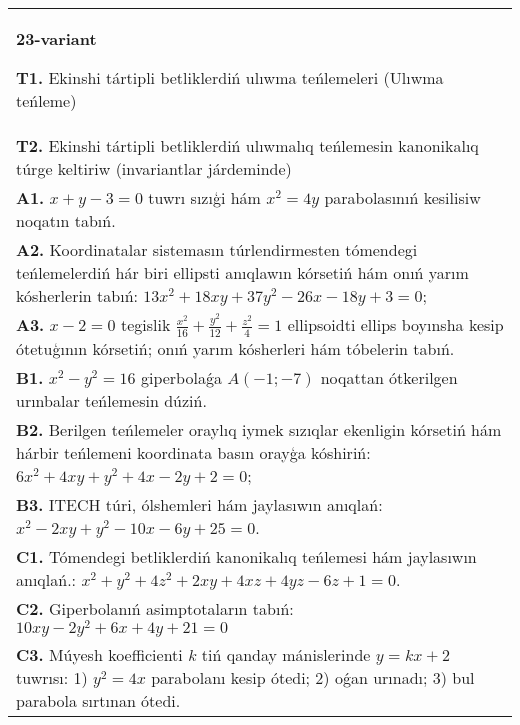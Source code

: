 \documentclass{article}
\begin{document}
\begin{tabular}{m{17cm}}
\textbf{23-variant}
\newline

\textbf{T1.} Ekinshi tártipli betliklerdiń ulıwma teńlemeleri (Ulıwma teńleme) \\
\textbf{T2.} Ekinshi tártipli betliklerdiń ulıwmalıq teńlemesin kanonikalıq túrge keltiriw (invariantlar járdeminde) \\
\textbf{A1.} $x+y-3=0$ tuwrı sızıģi hám $x^2=4 y$ parabolasınıń kesilisiw noqatın tabıń. \\
\textbf{A2.} Koordinatalar sistemasın túrlendirmesten tómendegi teńlemelerdiń hár biri ellipsti anıqlawın kórsetiń hám onıń yarım kósherlerin tabıń: $13 x^2+18 x y+37 y^2-26 x-18 y+3=0$; \\
\textbf{A3.} $x-2=0$ tegislik $\frac{x^2}{16}+\frac{y^2}{12}+\frac{z^2}{4}=1$ ellipsoidti ellips boyınsha kesip ótetuģının kórsetiń; onıń yarım kósherleri hám tóbelerin tabıń. \\
\textbf{B1.} $x^2-y^2=16$ giperbolaǵa $A (-1;-7)$ noqattan ótkerilgen urınbalar teńlemesin dúziń. \\
\textbf{B2.} Berilgen teńlemeler oraylıq iymek sızıqlar ekenligin kórsetiń hám hárbir teńlemeni koordinata basın orayģa kóshiriń: $6 x^2+4 x y+y^2+4 x-2 y+2=0$; \\
\textbf{B3.} ITECH túri, ólshemleri hám jaylasıwın anıqlań: $x^2-2 x y+y^2-10 x-6 y+25=0$. \\
\textbf{C1.} Tómendegi betliklerdiń kanonikalıq teńlemesi hám jaylasıwın anıqlań.: $x^2+y^2+4 z^2+2 x y+4 x z+4 y z-6 z+1=0$. \\
\textbf{C2.} Giperbolanıń asimptotaların tabıń: $10 x y-2 y^2+6 x+4 y+21=0$ \\
\textbf{C3.} Múyesh koefficienti $k$ tiń qanday mánislerinde $y=kx+2$ tuwrısı: 1) $y^2=4x$ parabolanı kesip ótedi; 2) oǵan urınadı; 3) bul parabola sırtınan ótedi. \\

\end{tabular}
\vspace{1cm}
\end{document}
